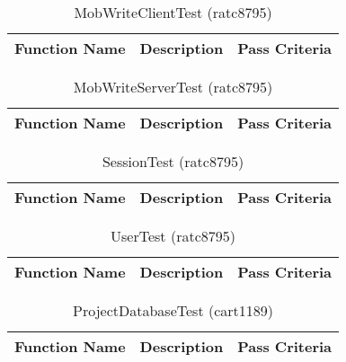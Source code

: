 \documentclass[14pt, a4paper]{article}
\begin{document}
\begin{table}[h]
	\centering
	\caption{MobWriteClientTest (ratc8795)}
	\begin{tabular}{|p{4cm}|p{5cm}|p{6cm}|}
		\hline
		\textbf{Function Name} & \textbf{Description} & \textbf{Pass Criteria}  \\\hline
	\end{tabular}
\end{table}
\begin{table}[h]
	\centering
	\caption{MobWriteServerTest (ratc8795)}
	\begin{tabular}{|p{4cm}|p{5cm}|p{6cm}|}
		\hline
		\textbf{Function Name} & \textbf{Description} & \textbf{Pass Criteria}  \\\hline
	\end{tabular}
\end{table}
\begin{table}[h]
	\centering
	\caption{SessionTest (ratc8795)}
	\begin{tabular}{|p{4cm}|p{5cm}|p{6cm}|}
		\hline
		\textbf{Function Name} & \textbf{Description} & \textbf{Pass Criteria}  \\\hline
	\end{tabular}
\end{table}
\begin{table}[h]
	\centering
	\caption{UserTest (ratc8795)}
	\begin{tabular}{|p{4cm}|p{5cm}|p{6cm}|}
		\hline
		\textbf{Function Name} & \textbf{Description} & \textbf{Pass Criteria}  \\\hline
	\end{tabular}
\end{table}


\begin{table}[h]
	\centering
	\caption{ProjectDatabaseTest (cart1189)}
	\begin{tabular}{|p{4cm}|p{5cm}|p{6cm}|}
		\hline
		\textbf{Function Name} & \textbf{Description} & \textbf{Pass Criteria}  \\\hline
	\end{tabular}
\end{table}
\end{document}
